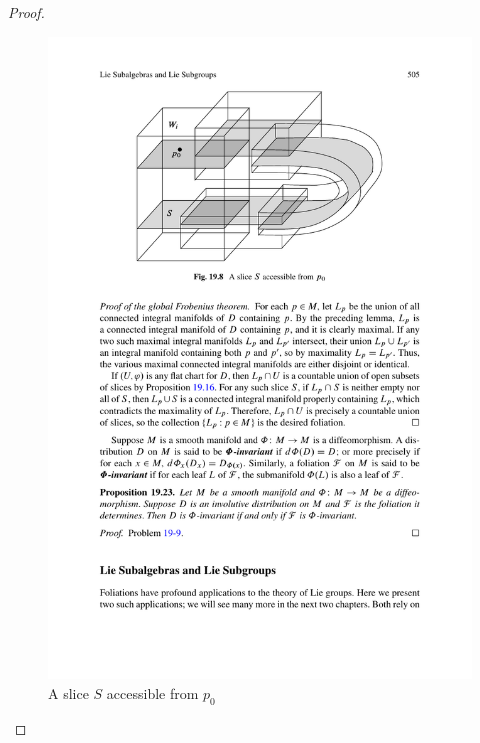 \begin{proof}
\begin{figure}[htbp]
\includegraphics{pictures/slice-accessible}
\caption{A slice $S$ accessible from $p_0$}
\end{figure}


\end{proof}
